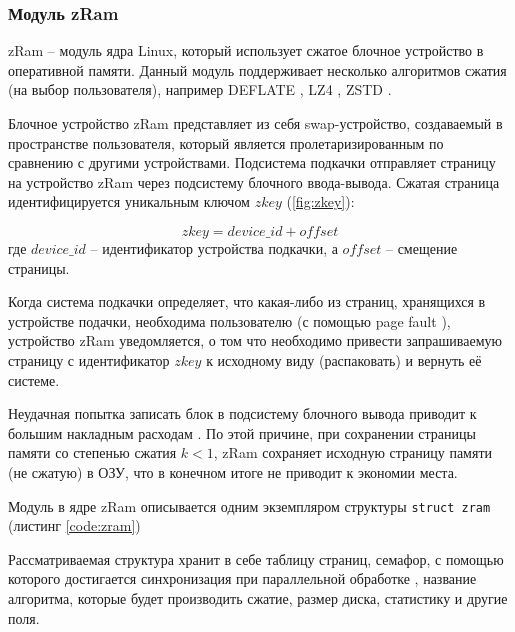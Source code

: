\subsubsection{Модуль zRam}

zRam \cite{zram} -- модуль ядра Linux, который использует сжатое блочное устройство в оперативной памяти. Данный модуль поддерживает несколько алгоритмов сжатия (на выбор пользователя), например DEFLATE \cite{deflate}, LZ4 \cite{lz4}, ZSTD \cite{zstd}. 

Блочное устройство zRam представляет из себя swap-устройство, создаваемый в пространстве пользователя, который является пролетаризированным по сравнению с другими устройствами. Подсистема подкачки отправляет страницу на устройство zRam через подсистему блочного ввода-вывода. Сжатая страница идентифицируется уникальным ключом $zkey$ (\ref{fig:zkey}):

\begin{equation}\label{fig:zkey}
	zkey = device\_id + offset
\end{equation}
где $device\_id$ -- идентификатор устройства подкачки, а $offset$ -- смещение страницы.

Когда система подкачки определяет, что какая-либо из страниц, хранящихся в устройстве подачки, необходима пользователю (с помощью page fault \cite{page-fault}), устройство zRam уведомляется, о том что необходимо привести запрашиваемую страницу с идентификатор $zkey$ к исходному виду (распаковать) и вернуть её системе.

Неудачная попытка записать блок в подсистему блочного вывода приводит к большим накладным расходам \cite{in-kernel-memory-compression}. По этой причине, при сохранении страницы памяти со степенью сжатия $k < 1$, zRam сохраняет исходную страницу памяти (не сжатую) в ОЗУ, что в конечном итоге не приводит к экономии места.

Модуль в ядре zRam описывается одним экземпляром структуры \texttt{struct zram} (листинг \ref{code:zram})


Рассматриваемая структура хранит в себе таблицу страниц, семафор, с помощью которого достигается синхронизация при параллельной обработке \cite{in-kernel-memory-compression}, название алгоритма, которые будет производить сжатие, размер диска, статистику и другие поля.

